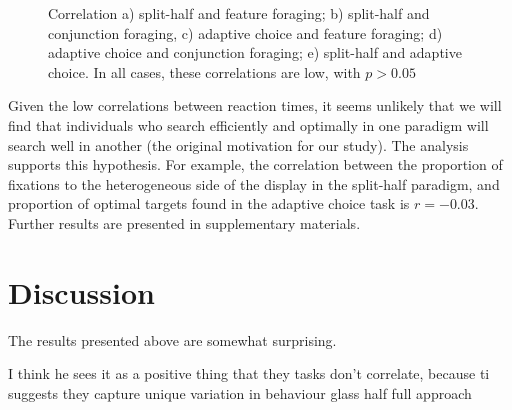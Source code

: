 \documentclass[]{rsos}%
\begin{document}
\begin{figure}
\caption{Correlation a) split-half and feature foraging; b) split-half and conjunction foraging, c) adaptive choice and feature  foraging; d) adaptive choice and conjunction foraging; e) split-half and adaptive choice. In all cases, these correlations are low, with $p>0.05$}
\label{fig:between_para_rt}
\end{figure}

Given the low correlations between reaction times, it seems unlikely that we will find that individuals who search efficiently and optimally in one paradigm will search well in another (the original motivation for our study). The analysis supports this hypothesis. For example, the correlation between the proportion of fixations to the heterogeneous side of the display in the split-half paradigm, and proportion of optimal targets found in the adaptive choice task is $r=-0.03$. Further results are presented in supplementary materials. 

\section{Discussion}

The results presented above are somewhat surprising. 


I think he sees it as a positive thing that they tasks don't correlate, because ti suggests they capture unique variation in behaviour
glass half full approach 



\end{document}
